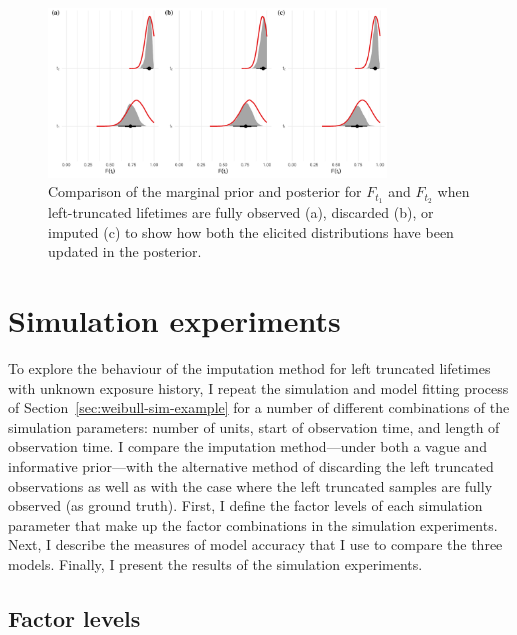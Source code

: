 \begin{figure}
    \centering
    \includegraphics[width=0.8\textwidth]{./figures/ch-2/prior-post-comp.pdf}
    \caption{Comparison of the marginal prior and posterior for $F_{t_1}$ and $F_{t_2}$ when left-truncated lifetimes are fully observed (a), discarded (b), or imputed (c) to show how both the elicited distributions have been updated in the posterior.}
    \label{fig:weibull-prior-post-comp}
\end{figure}

\section{Simulation experiments} \label{sec:weibull-sim-study}

To explore the behaviour of the imputation method for left truncated lifetimes with unknown exposure history, I repeat the simulation and model fitting process of Section~\ref{sec:weibull-sim-example} for a number of different combinations of the simulation parameters: number of units, start of observation time, and length of observation time. I compare the imputation method---under both a vague and informative prior---with the alternative method of discarding the left truncated observations as well as with the case where the left truncated samples are fully observed (as ground truth). First, I define the factor levels of each simulation parameter that make up the factor combinations in the simulation experiments. Next, I describe the measures of model accuracy that I use to compare the three models. Finally, I present the results of the simulation experiments.

\subsection{Factor levels}

